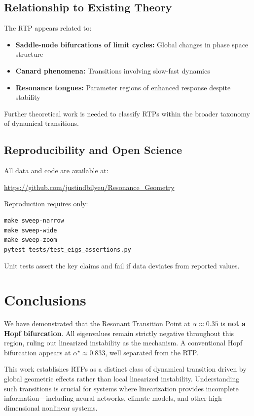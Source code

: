 \documentclass[11pt,twocolumn]{article}
\begin{document}
\subsection{Relationship to Existing Theory}

The RTP appears related to:
\begin{itemize}
  \item \textbf{Saddle-node bifurcations of limit cycles:} Global changes in phase space structure
  \item \textbf{Canard phenomena:} Transitions involving slow-fast dynamics
  \item \textbf{Resonance tongues:} Parameter regions of enhanced response despite stability
\end{itemize}

Further theoretical work is needed to classify RTPs within the broader taxonomy of dynamical transitions.

\subsection{Reproducibility and Open Science}

All data and code are available at:
\begin{center}
\url{https://github.com/justindbilyeu/Resonance_Geometry}
\end{center}

Reproduction requires only:
\begin{verbatim}
make sweep-narrow
make sweep-wide
make sweep-zoom
pytest tests/test_eigs_assertions.py
\end{verbatim}

Unit tests assert the key claims and fail if data deviates from reported values.

\section{Conclusions}

We have demonstrated that the Resonant Transition Point at $\alpha \approx 0.35$ is \textbf{not a Hopf
bifurcation}. All eigenvalues remain strictly negative throughout this region, ruling out linearized instability
as the mechanism. A conventional Hopf bifurcation appears at $\alpha^\star \approx 0.833$, well separated from
the RTP.

This work establishes RTPs as a distinct class of dynamical transition driven by global geometric effects rather
than local linearized instability. Understanding such transitions is crucial for systems where linearization
provides incomplete information—including neural networks, climate models, and other high-dimensional nonlinear
systems.
\end{document}
